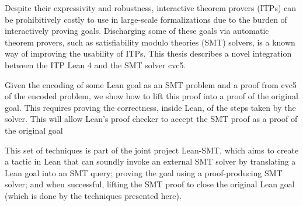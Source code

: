Despite their expressivity and robustness, interactive theorem provers (ITPs)
can be prohibitively costly to use in large-scale formalizations due to the burden of
interactively proving goals.
%
Discharging some of these goals via automatic theorem provers, such as
satisfiability modulo theories (SMT) solvers, is a known way of improving the
usability of ITPs.
%
This thesis describes a novel integration between the ITP
Lean 4 and the SMT solver cvc5.

Given the encoding of some Lean goal as an SMT problem and a proof from
cvc5 of the encoded problem, we show how to lift this proof into a proof
of the original goal.
%
This requires proving the correctness, inside Lean, of the steps taken by the
solver. This will allow Lean's proof checker to accept the SMT proof as a
proof of the original goal

This set of techniques is part of the joint project Lean-SMT, which aims to create a
tactic in Lean that can soundly invoke an external SMT solver by translating a Lean
goal into an SMT query; proving the goal using a proof-producing SMT solver; and
when successful, lifting the SMT proof to close the original Lean goal
(which is done by the techniques presented here).
